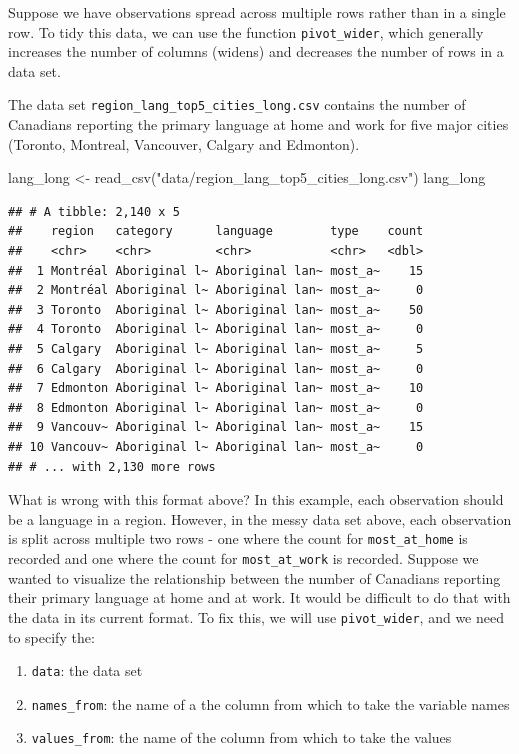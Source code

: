 \documentclass[
]{krantz}
\makeatletter
\newenvironment{Shaded}{\begin{snugshade}}{\end{snugshade}}
\newcommand{\FunctionTok}[1]{\textcolor[rgb]{0,0,0}{#1}}
\newcommand{\NormalTok}[1]{#1}
\newcommand{\OtherTok}[1]{\textcolor[rgb]{0.37,0.37,0.37}{#1}}
\newcommand{\StringTok}[1]{\textcolor[rgb]{0.5,0.5,0.5}{#1}}
\newenvironment{kframe}{%
\medskip{}
\setlength{\fboxsep}{.8em}
 \def\at@end@of@kframe{}%
 \ifinner\ifhmode%
  \def\at@end@of@kframe{\end{minipage}}%
  \begin{minipage}{\columnwidth}%
 \fi\fi%
 \def\FrameCommand##1{\hskip\@totalleftmargin \hskip-\fboxsep
 \colorbox{shadecolor}{##1}\hskip-\fboxsep
     \hskip-\linewidth \hskip-\@totalleftmargin \hskip\columnwidth}%
 \MakeFramed {\advance\hsize-\width
   \@totalleftmargin\z@ \linewidth\hsize
   \@setminipage}}%
 {\par\unskip\endMakeFramed%
 \at@end@of@kframe}
\renewenvironment{Shaded}{\begin{kframe}}{\end{kframe}}
\makeatother
\begin{document}
Suppose we have observations spread across multiple rows rather than in a single row. To tidy this data, we can use the function \texttt{pivot\_wider}, which generally increases the number of columns (widens) and decreases the number of rows in a data set.

The data set \texttt{region\_lang\_top5\_cities\_long.csv} contains the number of Canadians reporting the primary language at home and work for five major cities (Toronto, Montreal, Vancouver, Calgary and Edmonton).

\begin{Shaded}
\begin{Highlighting}[]
\NormalTok{lang\_long }\OtherTok{\textless{}{-}} \FunctionTok{read\_csv}\NormalTok{(}\StringTok{"data/region\_lang\_top5\_cities\_long.csv"}\NormalTok{)}
\NormalTok{lang\_long}
\end{Highlighting}
\end{Shaded}

\begin{verbatim}
## # A tibble: 2,140 x 5
##    region   category      language        type    count
##    <chr>    <chr>         <chr>           <chr>   <dbl>
##  1 Montréal Aboriginal l~ Aboriginal lan~ most_a~    15
##  2 Montréal Aboriginal l~ Aboriginal lan~ most_a~     0
##  3 Toronto  Aboriginal l~ Aboriginal lan~ most_a~    50
##  4 Toronto  Aboriginal l~ Aboriginal lan~ most_a~     0
##  5 Calgary  Aboriginal l~ Aboriginal lan~ most_a~     5
##  6 Calgary  Aboriginal l~ Aboriginal lan~ most_a~     0
##  7 Edmonton Aboriginal l~ Aboriginal lan~ most_a~    10
##  8 Edmonton Aboriginal l~ Aboriginal lan~ most_a~     0
##  9 Vancouv~ Aboriginal l~ Aboriginal lan~ most_a~    15
## 10 Vancouv~ Aboriginal l~ Aboriginal lan~ most_a~     0
## # ... with 2,130 more rows
\end{verbatim}

What is wrong with this format above? In this example, each observation should be a language in a region. However, in the messy data set above, each observation is split across multiple two rows - one where the count for \texttt{most\_at\_home} is recorded and one where the count for \texttt{most\_at\_work} is recorded. Suppose we wanted to visualize the relationship between the number of Canadians reporting their primary language at home and at work. It would be difficult to do that with the data in its current format. To fix this, we will use \texttt{pivot\_wider}, and we need to specify the:

\begin{enumerate}
\def\labelenumi{\arabic{enumi}.}
\item
  \texttt{data}: the data set
\item
  \texttt{names\_from}: the name of a the column from which to take the variable names
\item
  \texttt{values\_from}: the name of the column from which to take the values
\end{enumerate}
\end{document}
